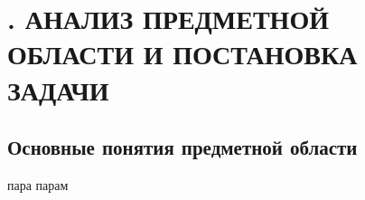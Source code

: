 \sectionbreak \section*{
  \cyrillicfont 
  \fontsize{14pt}{0pt}\selectfont
  \englishfont 
  . АНАЛИЗ ПРЕДМЕТНОЙ ОБЛАСТИ И ПОСТАНОВКА ЗАДАЧИ
}

\titlespace
\subsection*{ 
  \cyrillicfont 
  \fontsize{14pt}{0pt}\selectfont
  \englishfont
   Основные понятия предметной области
} 
\titlespace

{\cyrillicfont 
\fontsize{13pt}{16.25pt}\selectfont 
\englishfont 

  \par \redline пара парам
  \par
}


